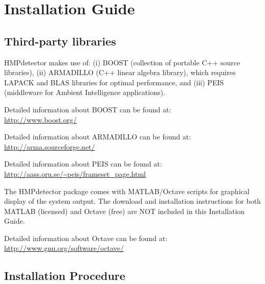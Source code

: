 \documentclass[10pt,a4paper]{report}
\begin{document}
\section{Installation Guide}
\label{Installation Guide}
\subsection{Third-party libraries}

HMPdetector makes use of: (i) BOOST (collection of portable C++ source libraries), (ii) ARMADILLO (C++ linear algebra library), which requires LAPACK and BLAS libraries for optimal performance, and (iii) PEIS (middleware for Ambient Intelligence applications).

Detailed information about BOOST can be found at:\\
\url{http://www.boost.org/}

Detailed information about ARMADILLO can be found at:\\ \url{http://arma.sourceforge.net/}

Detailed information about PEIS can be found at:\\ \url{http://aass.oru.se/~peis/frameset_page.html}

The HMPdetector package comes with MATLAB/Octave scripts for graphical display of the system output. The download and installation instructions for both MATLAB (licensed) and Octave (free) are NOT included in this Installation Guide.

Detailed information about Octave can be found at:\\ \url{http://www.gnu.org/software/octave/}

\subsection{Installation Procedure}
\end{document}
